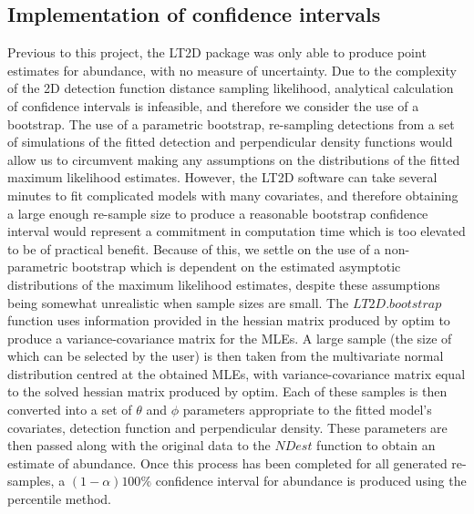 \documentclass[11pt]{article}
\begin{document}
\begin{multicols}{2}
\subsection{Implementation of confidence intervals}
Previous to this project, the LT2D package was only able to produce point estimates for abundance, with no measure of uncertainty. Due to the complexity of the 2D detection function distance sampling likelihood, analytical calculation of confidence intervals is infeasible, and therefore we consider the use of a bootstrap. The use of a parametric bootstrap, re-sampling detections from a set of simulations of the fitted detection and perpendicular density functions would allow us to circumvent making any assumptions on the distributions of the fitted maximum likelihood estimates. However, the LT2D software can take several minutes to fit complicated models with many covariates, and therefore obtaining a large enough re-sample size to produce a reasonable bootstrap confidence interval would represent a commitment in computation time which is too elevated to be of practical benefit.  Because of this, we settle on the use of a non-parametric bootstrap which is dependent on the estimated asymptotic distributions of the maximum likelihood estimates, despite these assumptions being somewhat unrealistic when sample sizes are small.  The $LT2D.bootstrap$ function uses information provided in the hessian matrix produced by optim to produce a variance-covariance matrix for the MLEs. A large sample (the size of which can be selected by the user) is then taken from  the multivariate normal distribution centred at the obtained MLEs, with variance-covariance matrix equal to the solved hessian matrix produced by optim. Each of these samples is then converted into a set of $\theta$ and $\phi$ parameters appropriate to the fitted model's covariates, detection function and perpendicular density. These parameters are then passed along with the original data to the $NDest$ function to obtain an estimate of abundance. Once this process has been completed for all generated re-samples, a $(1-\alpha) 100\%$ confidence interval for abundance is produced using the percentile method. 


\end{multicols}
\end{document}
